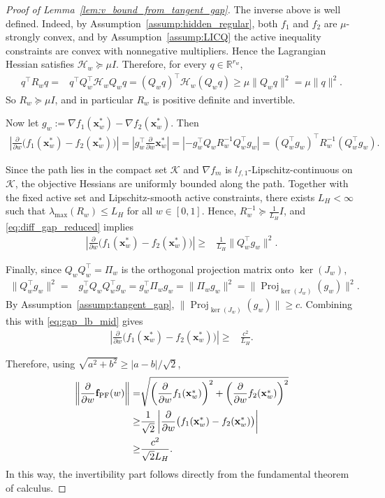 \documentclass{article}
\newcommand{\bx}{\mathbf{x}}
\newcommand{\fPF}{{\mathbf{f}_{\rm PF}}}
\newcommand{\Proj}{\operatorname{Proj}}
\begin{document}
\begin{proof}[Proof of Lemma~\ref{lem:v_bound_from_tangent_gap}]
The inverse above is well defined. Indeed, by Assumption~\ref{assump:hidden_regular}, both $f_1$ and $f_2$ are $\mu$-strongly convex, and by Assumption~\ref{assump:LICQ} the active inequality constraints are convex with nonnegative multipliers. Hence the Lagrangian Hessian satisfies $\mathcal H_w \succeq \mu I$. Therefore, for every $q\in\mathbb R^{r_w}$,
\begin{align}
q^\top R_w q
= & q^\top Q_w^\top \mathcal H_w Q_w q =(Q_w q)^\top \mathcal H_w (Q_w q) \ge \mu \|Q_w q\|^2 =\mu \|q\|^2.
\end{align}
So $R_w \succeq \mu I$, and in particular $R_w$ is positive definite and invertible.

Now let $g_w := \nabla f_1(\bx_w^*)-\nabla f_2(\bx_w^*)$. Then
\begin{align}
\left|\frac{\partial}{\partial w}\big(f_1(\bx_w^*)-f_2(\bx_w^*)\big)\right|
=\left|g_w^\top \frac{\partial}{\partial w}\bx_w^*\right|= \left|-g_w^\top Q_w R_w^{-1} Q_w^\top g_w\right| =(Q_w^\top g_w)^\top R_w^{-1}(Q_w^\top g_w).
\label{eq:diff_gap_reduced}
\end{align}

Since the path lies in the compact set $\mathcal K$ and $\nabla f_m$ is $l_{f,1}$-Lipschitz-continuous on $\mathcal K$, the objective Hessians are uniformly bounded along the path. Together with the fixed active set and Lipschitz-smooth active constraints, there exists $L_H<\infty$ such that $\lambda_{\max}(R_w)\le L_H$ for all $w\in[0,1]$. Hence, $R_w^{-1} \succeq \frac{1}{L_H} I$, and \eqref{eq:diff_gap_reduced} implies
\begin{align}
\left|\frac{\partial}{\partial w}\big(f_1(\bx_w^*)-f_2(\bx_w^*)\big)\right|
\ge & \frac{1}{L_H}\|Q_w^\top g_w\|^2.
\label{eq:gap_lb_mid}
\end{align}

Finally, since $Q_w Q_w^\top=\Pi_w$ is the orthogonal projection matrix onto $\ker(J_w)$,
\begin{align}
\|Q_w^\top g_w\|^2
= & g_w^\top Q_w Q_w^\top g_w = g_w^\top \Pi_w g_w =\|\Pi_w g_w\|^2 =\|\Proj_{\ker(J_w)}(g_w)\|^2.
\end{align}
By Assumption~\ref{assump:tangent_gap}, $\|\Proj_{\ker(J_w)}(g_w)\| \ge c$. Combining this with \eqref{eq:gap_lb_mid} gives
\begin{align}
\left|\frac{\partial}{\partial w}\big(f_1(\bx_w^*)-f_2(\bx_w^*)\big)\right|
\ge & \frac{c^2}{L_H}.
\end{align}

Therefore, using $\sqrt{a^2+b^2}\ge |a-b|/\sqrt2$,
\begin{align}
\left\|\frac{\partial}{\partial w}\fPF(w)\right\|
= & \sqrt{\left(\frac{\partial}{\partial w}f_1(\bx_w^*)\right)^2+\left(\frac{\partial}{\partial w}f_2(\bx_w^*)\right)^2} \nonumber\\
\ge & \frac{1}{\sqrt2}\left|\frac{\partial}{\partial w}\big(f_1(\bx_w^*)-f_2(\bx_w^*)\big)\right| \nonumber\\
\ge & \frac{c^2}{\sqrt2 L_H}.
\end{align}
In this way, the invertibility part follows directly from the fundamental theorem of calculus.
\end{proof}
\end{document}
